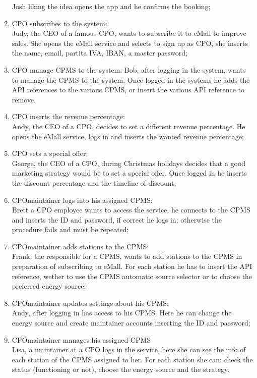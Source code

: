 \begin{enumerate}[label=\textbf{S\arabic*}]
            Josh liking the idea opens the app and he confirms the booking;\label{SCE:user-gets-suggestions}
      \item \ac{CPO} subscribes to the system:\\
            Judy, the CEO of a famous \ac{CPO}, wants to subscribe it to \ac{eMall} to improve sales.
            She opens the \ac{eMall} service and selects to sign up as \ac{CPO}, she inserts the name, email, \gls{partita IVA}, \ac{IBAN}, a master password;\label{SCE:cpo-signs-up}
      \item \ac{CPO} manage \ac{CPMS} to the system:
            Bob, after logging in the system, wants to manage the \ac{CPMS} to the system. Once logged in the systems he adds the \ac{API} references to the various \ac{CPMS}, or insert the various \ac{API} reference to remove.
      \item \ac{CPO} inserts the revenue percentage:\\
            Andy, the CEO of a \ac{CPO}, decides to set a different revenue percentage. He opens the \ac{eMall} service, logs in and inserts the wanted revenue percentage;\label{SCE:cpo-sets-revenue-percentage}
      \item \ac{CPO} sets a special offer:\\
            George, the CEO of a \ac{CPO}, during Christmas holidays decides that a good marketing strategy would be to set a special offer. Once logged in he inserts the discount percentage and the timeline of discount; \label{SCE:cpo-sets-special-offer}
      \item \ac{CPO}maintainer logs into his assigned \ac{CPMS}:\\
            Brett a \ac{CPO} employee wants to access the service, he connects to the \ac{CPMS} and inserts the ID
            and password, if correct he logs in; otherwise the procedure fails and must be repeated;\label{SCE:cpomaintainer-logs-in}
      \item \ac{CPO}maintainer adds stations to the \ac{CPMS}:\\
            Frank, the responsible for a \ac{CPMS}, wants to add stations to the \ac{CPMS} in preparation of subscribing to \ac{eMall}. For each station he has to insert the \ac{API} reference,
            wether to use the \ac{CPMS} automatic source selector or to choose the preferred energy source;\label{SCE:cpomaintainer-adds-stations}
      \item \ac{CPO}maintainer updates settings about his \ac{CPMS}:\\
            Andy, after logging in has access to his \ac{CPMS}.
            Here he can change the energy source and create maintainer accounts inserting the ID and password;\label{SCE:cpomaintainer-updates-settings}
      \item \ac{CPO}maintainer manages his assigned \ac{CPMS}\\
            Lisa, a maintainer at a \ac{CPO} logs in the service, here she can see the info of each station of the \ac{CPMS} assigned to her.
            For each station she can: check the status (functioning or not), choose the energy source and the strategy.\label{SCE:cpomaintainer-manages}
\end{enumerate}
